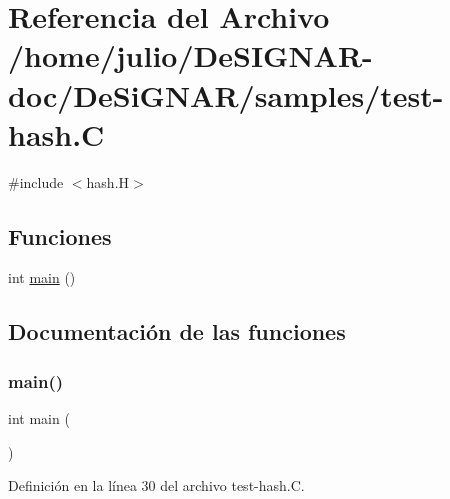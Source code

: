 \hypertarget{test-hash_8_c}{}\section{Referencia del Archivo /home/julio/\+De\+S\+I\+G\+N\+A\+R-\/doc/\+De\+Si\+G\+N\+A\+R/samples/test-\/hash.C}
\label{test-hash_8_c}
{\ttfamily \#include $<$hash.\+H$>$}\newline
\subsection*{Funciones}
\begin{DoxyCompactItemize}
\item 
int \hyperlink{test-hash_8_c_ae66f6b31b5ad750f1fe042a706a4e3d4}{main} ()
\end{DoxyCompactItemize}


\subsection{Documentación de las funciones}
\mbox{\label{test-hash_8_c_ae66f6b31b5ad750f1fe042a706a4e3d4}} 
\subsubsection{\texorpdfstring{main()}{main()}}
{\footnotesize\ttfamily int main (\begin{DoxyParamCaption}{ }\end{DoxyParamCaption})}



Definición en la línea 30 del archivo test-\/hash.\+C.

